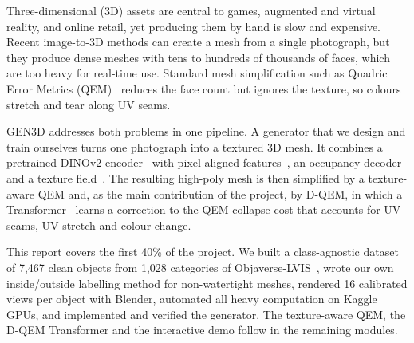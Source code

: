 Three-dimensional (3D) assets are central to games, augmented and virtual reality, and online retail, yet producing them by hand is slow and expensive. Recent image-to-3D methods can create a mesh from a single photograph, but they produce dense meshes with tens to hundreds of thousands of faces, which are too heavy for real-time use. Standard mesh simplification such as Quadric Error Metrics (QEM)~\cite{garland1997qem} reduces the face count but ignores the texture, so colours stretch and tear along UV seams.

GEN3D addresses both problems in one pipeline. A generator that we design and train ourselves turns one photograph into a textured 3D mesh. It combines a pretrained DINOv2 encoder~\cite{oquab2023dinov2} with pixel-aligned features~\cite{saito2019pifu,xu2019disn}, an occupancy decoder~\cite{mescheder2019onet} and a texture field~\cite{oechsle2019texturefields}. The resulting high-poly mesh is then simplified by a texture-aware QEM and, as the main contribution of the project, by D-QEM, in which a Transformer~\cite{vaswani2017attention} learns a correction to the QEM collapse cost that accounts for UV seams, UV stretch and colour change.

This report covers the first 40\% of the project. We built a class-agnostic dataset of 7{,}467 clean objects from 1{,}028 categories of Objaverse-LVIS~\cite{deitke2023objaverse}, wrote our own inside/outside labelling method for non-watertight meshes, rendered 16 calibrated views per object with Blender, automated all heavy computation on Kaggle GPUs, and implemented and verified the generator. The texture-aware QEM, the D-QEM Transformer and the interactive demo follow in the remaining modules.
